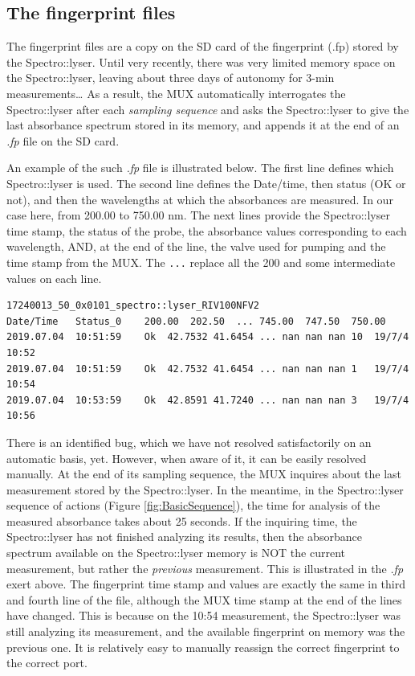 \documentclass[]{book}
\begin{document}
\hypertarget{the-fingerprint-files}{%
\subsection{The fingerprint files}\label{the-fingerprint-files}}

The fingerprint files are a copy on the SD card of the fingerprint (.fp) stored by the Spectro::lyser. Until very recently, there was very limited memory space on the Spectro::lyser, leaving about three days of autonomy for 3-min measurements\ldots{} As a result, the MUX automatically interrogates the Spectro::lyser after each \emph{sampling sequence} and asks the Spectro::lyser to give the last absorbance spectrum stored in its memory, and appends it at the end of an \emph{.fp} file on the SD card.

An example of the such \emph{.fp} file is illustrated below. The first line defines which Spectro::lyser is used. The second line defines the Date/time, then status (OK or not), and then the wavelengths at which the absorbances are measured. In our case here, from 200.00 to 750.00 nm. The next lines provide the Spectro::lyser time stamp, the status of the probe, the absorbance values corresponding to each wavelength, AND, at the end of the line, the valve used for pumping and the time stamp from the MUX. The \texttt{...} replace all the 200 and some intermediate values on each line.

\begin{verbatim}
17240013_50_0x0101_spectro::lyser_RIV100NFV2
Date/Time   Status_0    200.00  202.50  ... 745.00  747.50  750.00
2019.07.04  10:51:59    Ok  42.7532 41.6454 ... nan nan nan 10  19/7/4 10:52
2019.07.04  10:51:59    Ok  42.7532 41.6454 ... nan nan nan 1   19/7/4 10:54
2019.07.04  10:53:59    Ok  42.8591 41.7240 ... nan nan nan 3   19/7/4 10:56
\end{verbatim}

There is an identified bug, which we have not resolved satisfactorily on an automatic basis, yet. However, when aware of it, it can be easily resolved manually. At the end of its sampling sequence, the MUX inquires about the last measurement stored by the Spectro::lyser. In the meantime, in the Spectro::lyser sequence of actions (Figure \ref{fig:BasicSequence}), the time for analysis of the measured absorbance takes about 25 seconds. If the inquiring time, the Spectro::lyser has not finished analyzing its results, then the absorbance spectrum available on the Spectro::lyser memory is NOT the current measurement, but rather the \emph{previous} measurement. This is illustrated in the \emph{.fp} exert above. The fingerprint time stamp and values are exactly the same in third and fourth line of the file, although the MUX time stamp at the end of the lines have changed. This is because on the 10:54 measurement, the Spectro::lyser was still analyzing its measurement, and the available fingerprint on memory was the previous one. It is relatively easy to manually reassign the correct fingerprint to the correct port.
\end{document}
